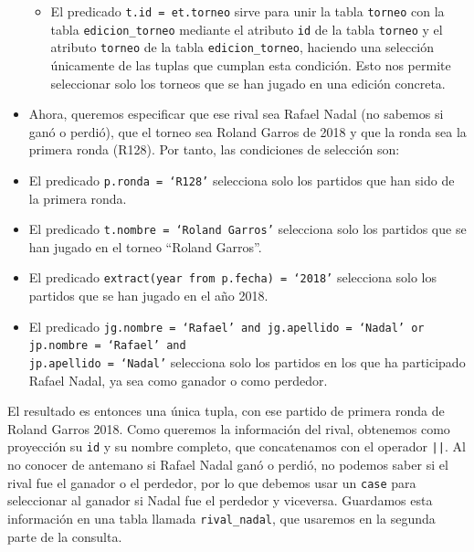 \documentclass[11pt]{opticajnl}
\begin{document}
\begin{itemize}
\begin{itemize}
\item El predicado \texttt{t.id = et.torneo} sirve para unir la tabla \texttt{torneo} con la tabla \texttt{edicion\_torneo} mediante el atributo \texttt{id} de la tabla \texttt{torneo} y el atributo \texttt{torneo} de la tabla \texttt{edicion\_torneo}, haciendo una selección únicamente de las tuplas que cumplan esta condición. Esto nos permite seleccionar solo los torneos que se han jugado en una edición concreta.
\end{itemize}
\item Ahora, queremos especificar que ese rival sea Rafael Nadal (no sabemos si ganó o perdió), que el torneo sea Roland Garros de 2018 y que la ronda sea la primera ronda (R128). Por tanto, las condiciones de selección son:
\item El predicado \texttt{p.ronda = `R128'} selecciona solo los partidos que han sido de la primera ronda.
\item El predicado \texttt{t.nombre = `Roland Garros'} selecciona solo los partidos que se han jugado en el torneo ``Roland Garros''.
\item El predicado \texttt{extract(year from p.fecha) = `2018'} selecciona solo los partidos que se han jugado en el año 2018.
\item El predicado \texttt{jg.nombre = `Rafael' and jg.apellido = `Nadal' or jp.nombre = `Rafael' and}\\ \texttt{jp.apellido = `Nadal'} selecciona solo los partidos en los que ha participado Rafael Nadal, ya sea como ganador o como perdedor.
\end{itemize}

El resultado es entonces una única tupla, con ese partido de primera ronda de Roland Garros 2018. Como queremos la información del rival, obtenemos como proyección su \texttt{id} y su nombre completo, que concatenamos con el operador \texttt{||}. Al no conocer de antemano si Rafael Nadal ganó o perdió, no podemos saber si el rival fue el ganador o el perdedor, por lo que debemos usar un \texttt{case} para seleccionar al ganador si Nadal fue el perdedor y viceversa. Guardamos esta información en una tabla llamada \texttt{rival\_nadal}, que usaremos en la segunda parte de la consulta. \\
\end{document}
